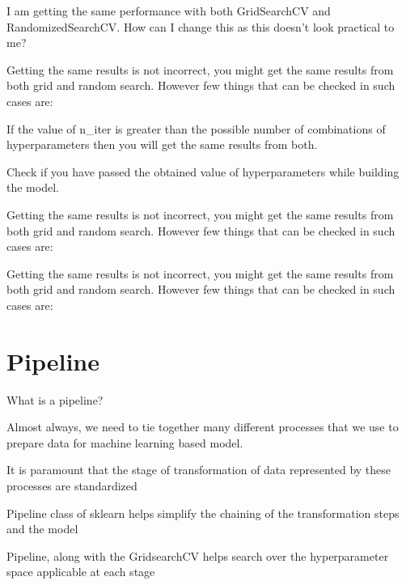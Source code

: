 	\begin{qanda}
		\begin{question}
I am getting the same performance with both GridSearchCV and RandomizedSearchCV.  How can I change this as this doesn't look practical to me?
		\end{question}

		\begin{answer}
Getting the same results is not incorrect, you might get the same results from both grid and random search.  However few things that can be checked in such cases are:
	\begin{bulletedlist}
		\item If the value of n\_iter is greater than the possible number of combinations of hyperparameters then you will get the same results from both.
		\item Check if you have passed the obtained value of hyperparameters while building the model.
	\end{bulletedlist}

Getting the same results is not incorrect, you might get the same results from both grid and random search.  However few things that can be checked in such cases are:

Getting the same results is not incorrect, you might get the same results from both grid and random search.  However few things that can be checked in such cases are:
		\end{answer}
	\end{qanda}


	\section{Pipeline}
What is a pipeline?
	\begin{bulletedlist}
		\item Almost always, we need to tie together many different processes that we use to prepare data for machine learning based model.
		\item It is paramount that the stage of transformation of data represented by these processes are standardized
		\item Pipeline class of sklearn helps simplify the chaining of the transformation steps and the model
		\item Pipeline, along with the GridsearchCV helps search over the hyperparameter space applicable at each stage
	\end{bulletedlist}

